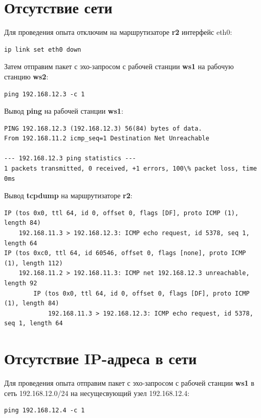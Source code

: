 \documentclass[a4paper,12pt]{article}
\begin{document}
\section{Отсутствие сети}

Для проведения опыта отключим на маршрутизаторе \textbf{r2} интерфейс eth0:

\begin{Verbatim}
ip link set eth0 down
\end{Verbatim}

Затем отправим пакет с эхо-запросом с рабочей станции \textbf{ws1} на рабочую станцию
\textbf{ws2}:

\begin{Verbatim}
ping 192.168.12.3 -c 1
\end{Verbatim}

Вывод \textbf{ping} на рабочей станции \textbf{ws1}:

\begin{Verbatim}
PING 192.168.12.3 (192.168.12.3) 56(84) bytes of data.
From 192.168.11.2 icmp_seq=1 Destination Net Unreachable

--- 192.168.12.3 ping statistics ---
1 packets transmitted, 0 received, +1 errors, 100\% packet loss, time 0ms
\end{Verbatim}

Вывод \textbf{tcpdump} на маршрутизаторе \textbf{r2}:

\begin{Verbatim}
IP (tos 0x0, ttl 64, id 0, offset 0, flags [DF], proto ICMP (1), length 84)
    192.168.11.3 > 192.168.12.3: ICMP echo request, id 5378, seq 1, length 64
IP (tos 0xc0, ttl 64, id 60546, offset 0, flags [none], proto ICMP (1), length 112)
    192.168.11.2 > 192.168.11.3: ICMP net 192.168.12.3 unreachable, length 92
	    IP (tos 0x0, ttl 64, id 0, offset 0, flags [DF], proto ICMP (1), length 84)
	        192.168.11.3 > 192.168.12.3: ICMP echo request, id 5378, seq 1, length 64
\end{Verbatim}

\section{Отсутствие IP-адреса в сети}

Для проведения опыта отправим пакет с эхо-запросом с рабочей станции \textbf{ws1} в сеть
192.168.12.0/24 на несущесвующий узел 192.168.12.4:

\begin{Verbatim}
ping 192.168.12.4 -c 1
\end{Verbatim}
\end{document}
